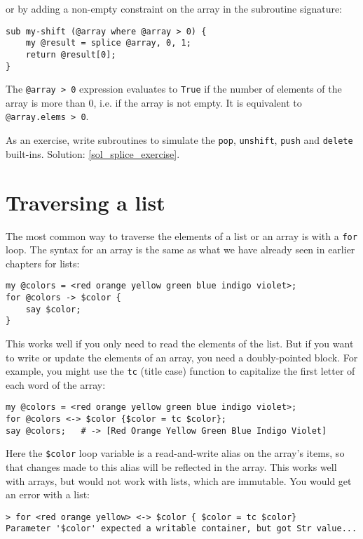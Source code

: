 or by adding a non-empty constraint on the array in the 
subroutine signature:
\begin{verbatim}
sub my-shift (@array where @array > 0) {
    my @result = splice @array, 0, 1;
    return @result[0];
}    
\end{verbatim}
%

The \verb'@array > 0' expression evaluates to {\tt True} if 
the number of elements of the array is more than 0, i.e. if the 
array is not empty. It is equivalent to \verb'@array.elems > 0'.

\label{splice_exercise}
As an exercise, write subroutines to simulate the {\tt pop}, 
{\tt unshift}, {\tt push} and {\tt delete} built-ins. Solution: \ref{sol_splice_exercise}.


\section{Traversing a list}

The most common way to traverse the elements of a list or an 
array is with a {\tt for} loop.  The syntax for an array is 
the same as what we have already seen in earlier chapters 
for lists:

\begin{verbatim}
my @colors = <red orange yellow green blue indigo violet>;
for @colors -> $color {
    say $color;
}
\end{verbatim}
%
This works well if you only need to read the elements of the
list.  But if you want to write or update the elements of an array, you
need a doubly-pointed block. For example, you might use the 
{\tt tc} (title case) function to capitalize the first letter 
of each word of the array:

\begin{verbatim}
my @colors = <red orange yellow green blue indigo violet>;
for @colors <-> $color {$color = tc $color};
say @colors;   # -> [Red Orange Yellow Green Blue Indigo Violet]
\end{verbatim}
%
Here the \verb'$color' loop variable is a read-and-write alias 
on the array's items, so that changes made to this alias will 
be reflected in the array. This works well with arrays, but 
would not work with lists, which are immutable. You would 
get an error with a list:

\begin{verbatim}
> for <red orange yellow> <-> $color { $color = tc $color}
Parameter '$color' expected a writable container, but got Str value...
\end{verbatim}


